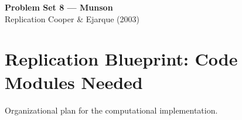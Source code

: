 \documentclass[12pt]{article}
\begin{document}
	
	\begin{center}
		{\Large \textbf{Problem Set 8 --- Munson}}\\[0.5em]
		Replication Cooper \& Ejarque (2003)
	\end{center}
	
	\vspace{1em}
	
	
	\section*{Replication Blueprint: Code Modules Needed}
	
	Organizational plan for the computational implementation.
	
\end{document}
